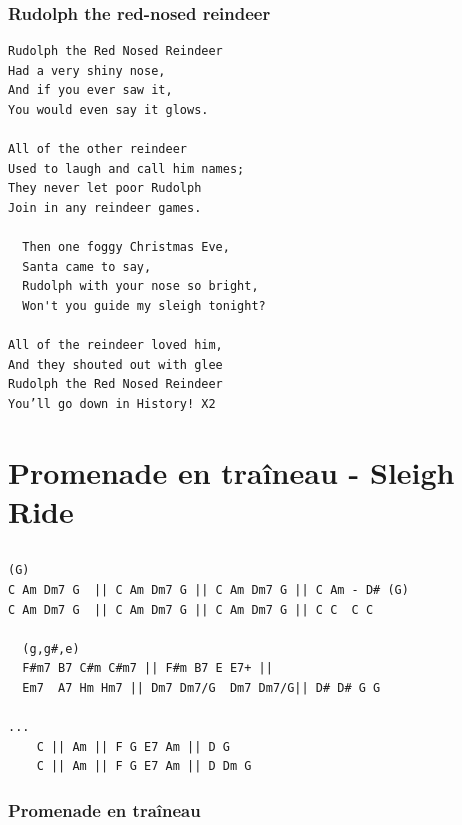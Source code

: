 \documentclass[
]{article}
\begin{document}
\hypertarget{rudolph-the-red-nosed-reindeer}{%
\subsubsection*{Rudolph the red-nosed
reindeer}\label{rudolph-the-red-nosed-reindeer}}

\begin{verbatim}
Rudolph the Red Nosed Reindeer 
Had a very shiny nose, 
And if you ever saw it, 
You would even say it glows. 

All of the other reindeer 
Used to laugh and call him names; 
They never let poor Rudolph 
Join in any reindeer games.

  Then one foggy Christmas Eve, 
  Santa came to say, 
  Rudolph with your nose so bright, 
  Won't you guide my sleigh tonight?
  
All of the reindeer loved him,
And they shouted out with glee
Rudolph the Red Nosed Reindeer
You’ll go down in History! X2
\end{verbatim}

\hypertarget{promenade-en-trauxeeneau---sleigh-ride}{%
\section{Promenade en traîneau - Sleigh
Ride}\label{promenade-en-trauxeeneau---sleigh-ride}}

\hypertarget{section-11}{%
\subsection*{}\label{section-11}}

\begin{verbatim}
(G) 
C Am Dm7 G  || C Am Dm7 G || C Am Dm7 G || C Am - D# (G) 
C Am Dm7 G  || C Am Dm7 G || C Am Dm7 G || C C  C C

  (g,g#,e)
  F#m7 B7 C#m C#m7 || F#m B7 E E7+ || 
  Em7  A7 Hm Hm7 || Dm7 Dm7/G  Dm7 Dm7/G|| D# D# G G

...
    C || Am || F G E7 Am || D G
    C || Am || F G E7 Am || D Dm G
\end{verbatim}

\hypertarget{promenade-en-trauxeeneau}{%
\subsubsection*{Promenade en traîneau}\label{promenade-en-trauxeeneau}}
\end{document}
